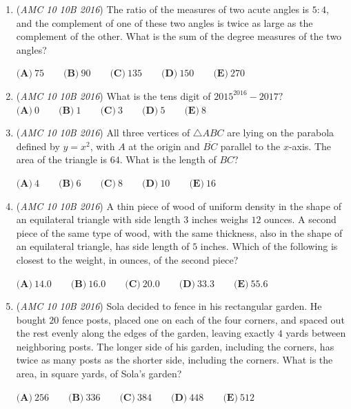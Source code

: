 \begin{enumerate}
 $\textbf{(A)}\ 1\qquad\textbf{(B)}\ 4\qquad\textbf{(C)}\ 5\qquad\textbf{(D)}\ 15\qquad\textbf{(E)}\ 20$


	\item (\textit{AMC 10 10B 2016}) The ratio of the measures of two acute angles is $5:4$, and the complement of one of these two angles is twice as large as the complement of the other. What is the sum of the degree measures of the two angles?


 $\textbf{(A)}\ 75\qquad\textbf{(B)}\ 90\qquad\textbf{(C)}\ 135\qquad\textbf{(D)}\ 150\qquad\textbf{(E)}\ 270$


	\item (\textit{AMC 10 10B 2016}) What is the tens digit of $2015^{2016}-2017?$
$\textbf{(A)}\ 0 \qquad \textbf{(B)}\ 1 \qquad \textbf{(C)}\ 3 \qquad \textbf{(D)}\ 5 \qquad \textbf{(E)}\ 8$


	\item (\textit{AMC 10 10B 2016}) All three vertices of $\bigtriangleup ABC$ are lying on the parabola defined by $y=x^2$, with $A$ at the origin and $\overline{BC}$ parallel to the $x$-axis. The area of the triangle is $64$. What is the length of $BC$?


 $\textbf{(A)}\ 4\qquad\textbf{(B)}\ 6\qquad\textbf{(C)}\ 8\qquad\textbf{(D)}\ 10\qquad\textbf{(E)}\ 16$


	\item (\textit{AMC 10 10B 2016}) A thin piece of wood of uniform density in the shape of an equilateral triangle with side length $3$ inches weighs $12$ ounces. A second piece of the same type of wood, with the same thickness, also in the shape of an equilateral triangle, has side length of $5$ inches. Which of the following is closest to the weight, in ounces, of the second piece?


 $\textbf{(A)}\ 14.0\qquad\textbf{(B)}\ 16.0\qquad\textbf{(C)}\ 20.0\qquad\textbf{(D)}\ 33.3\qquad\textbf{(E)}\ 55.6$


	\item (\textit{AMC 10 10B 2016}) Sola decided to fence in his rectangular garden. He bought $20$ fence posts, placed one on each of the four corners, and spaced out the rest evenly along the edges of the garden, leaving exactly $4$ yards between neighboring posts. The longer side of his garden, including the corners, has twice as many posts as the shorter side, including the corners. What is the area, in square yards, of Sola’s garden?


 $\textbf{(A)}\ 256\qquad\textbf{(B)}\ 336\qquad\textbf{(C)}\ 384\qquad\textbf{(D)}\ 448\qquad\textbf{(E)}\ 512$



\end{enumerate}
